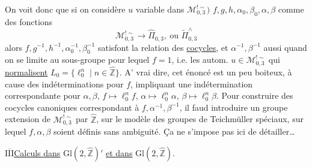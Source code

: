On voit donc que si on considère  $u$ variable dans $\mathcal M_{0,3}^{!\sim})$ $f,g,h,\alpha_0,\beta_0,\alpha,\beta$ comme des fonctions
\[
\mathcal M_{0,3}^{!\sim}\longrightarrow\widehat{\Pi}_{0,3},\ \text{ou }\widetilde{\Pi}_{0,3}^{\wedge}
\]
alors $f,g^{-1},h^{-1},\alpha_0^{-1},\beta_0^{-1}$ satisfont la relation des \uline{cocycles}, et $\alpha^{-1},\beta^{-1}$ aussi quand on se limite au sous-groupe pour lequel $f=1$, i.e. les autom. $u\in\mathcal M_{0,3}^{!\sim}$ qui \uline{normalisent}  $L_0=\{\ell_0^n\mid n\in\widehat{\mathbb Z}\}$. A' vrai dire, cet énoncé  est un peu boiteux, à cause des indéterminations pour $f$, impliquant une indétermination correspondante pour $\alpha,\beta$, $f\mapsto\ell_0^n f$, $\alpha\mapsto\ell_0^n\alpha$, $\beta\mapsto\ell_0^n\beta$. Pour construire des cocycles canoniques correspondant à $f,\alpha^{-1},\beta^{-1}$, il faud introduire un groupe extension de $\mathcal M_{0,3}^{!\sim}$ par $\widehat{\mathbb Z}$, sur le modèle des groupes de Teichmüller spéciaux, sur lequel $f,\alpha,\beta$ soient définis sans ambiguité. Ça ne s'impose pas ici de détailler\ldots


\uline{$\overline{\mathrm{III}}$}\quad \uline{Calculs dans} $\mathrm{Gl}(2,\widehat{\mathbb Z})'$ \uline{et dans} $\mathrm{Gl}(2,\widehat{\mathbb Z})$.

